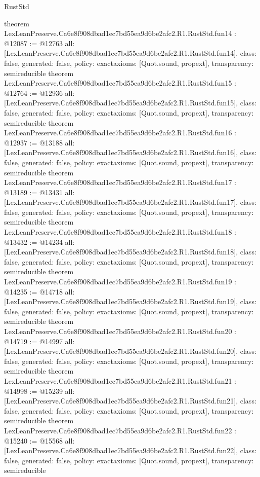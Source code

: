 \begin{lexlean}{RustStd}
\begin{coremodule}
{}
theorem LexLeanPreserve.Ca6e8f908dbad1ec7bd55ea9d6be2afc2.R1.RustStd.fun14 : @12087 := @12763 {
  all: [LexLeanPreserve.Ca6e8f908dbad1ec7bd55ea9d6be2afc2.R1.RustStd.fun14],
  class: false,
  generated: false,
  policy: exact{axioms: [Quot.sound, propext]},
  transparency: semireducible
}
theorem LexLeanPreserve.Ca6e8f908dbad1ec7bd55ea9d6be2afc2.R1.RustStd.fun15 : @12764 := @12936 {
  all: [LexLeanPreserve.Ca6e8f908dbad1ec7bd55ea9d6be2afc2.R1.RustStd.fun15],
  class: false,
  generated: false,
  policy: exact{axioms: [Quot.sound, propext]},
  transparency: semireducible
}
theorem LexLeanPreserve.Ca6e8f908dbad1ec7bd55ea9d6be2afc2.R1.RustStd.fun16 : @12937 := @13188 {
  all: [LexLeanPreserve.Ca6e8f908dbad1ec7bd55ea9d6be2afc2.R1.RustStd.fun16],
  class: false,
  generated: false,
  policy: exact{axioms: [Quot.sound, propext]},
  transparency: semireducible
}
theorem LexLeanPreserve.Ca6e8f908dbad1ec7bd55ea9d6be2afc2.R1.RustStd.fun17 : @13189 := @13431 {
  all: [LexLeanPreserve.Ca6e8f908dbad1ec7bd55ea9d6be2afc2.R1.RustStd.fun17],
  class: false,
  generated: false,
  policy: exact{axioms: [Quot.sound, propext]},
  transparency: semireducible
}
theorem LexLeanPreserve.Ca6e8f908dbad1ec7bd55ea9d6be2afc2.R1.RustStd.fun18 : @13432 := @14234 {
  all: [LexLeanPreserve.Ca6e8f908dbad1ec7bd55ea9d6be2afc2.R1.RustStd.fun18],
  class: false,
  generated: false,
  policy: exact{axioms: [Quot.sound, propext]},
  transparency: semireducible
}
theorem LexLeanPreserve.Ca6e8f908dbad1ec7bd55ea9d6be2afc2.R1.RustStd.fun19 : @14235 := @14718 {
  all: [LexLeanPreserve.Ca6e8f908dbad1ec7bd55ea9d6be2afc2.R1.RustStd.fun19],
  class: false,
  generated: false,
  policy: exact{axioms: [Quot.sound, propext]},
  transparency: semireducible
}
theorem LexLeanPreserve.Ca6e8f908dbad1ec7bd55ea9d6be2afc2.R1.RustStd.fun20 : @14719 := @14997 {
  all: [LexLeanPreserve.Ca6e8f908dbad1ec7bd55ea9d6be2afc2.R1.RustStd.fun20],
  class: false,
  generated: false,
  policy: exact{axioms: [Quot.sound, propext]},
  transparency: semireducible
}
theorem LexLeanPreserve.Ca6e8f908dbad1ec7bd55ea9d6be2afc2.R1.RustStd.fun21 : @14998 := @15239 {
  all: [LexLeanPreserve.Ca6e8f908dbad1ec7bd55ea9d6be2afc2.R1.RustStd.fun21],
  class: false,
  generated: false,
  policy: exact{axioms: [Quot.sound, propext]},
  transparency: semireducible
}
theorem LexLeanPreserve.Ca6e8f908dbad1ec7bd55ea9d6be2afc2.R1.RustStd.fun22 : @15240 := @15568 {
  all: [LexLeanPreserve.Ca6e8f908dbad1ec7bd55ea9d6be2afc2.R1.RustStd.fun22],
  class: false,
  generated: false,
  policy: exact{axioms: [Quot.sound, propext]},
  transparency: semireducible
}
\end{coremodule}
\end{lexlean}
